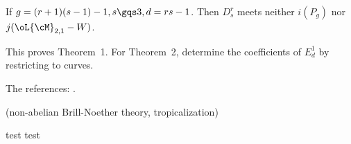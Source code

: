 \documentclass[a4paper, twoside]{article}
\begin{document}
\begin{thm}[Proposition~4.1]
	If $g=(r+1)(s-1)-1, s\gqs3, d=rs-1$. Then $D_{s}^{r}$ meets neither $i(P_{g})$ nor $j(\oL{\cM}_{2,1}-W)$.
\end{thm}

This proves Theorem~1. For Theorem~2, determine the coefficients of $E_{d}^{1}$ by restricting to curves.



The references: \cite{FP2005,Farkas2009}.




(non-abelian Brill-Noether theory, tropicalization)


test test \cite{Hejhal1976,Hejhal1983}




\end{document}

